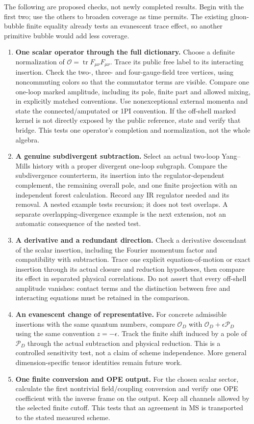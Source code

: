 \documentclass[11pt]{article}
\newcommand{\tr}{\operatorname{tr}}
\begin{document}
The following are proposed checks, not newly completed results. Begin with
the first two; use the others to broaden coverage as time permits. The
existing gluon-bubble finite equality already tests an evanescent trace
effect, so another primitive bubble would add less coverage.

\begin{enumerate}
\item \textbf{One scalar operator through the full dictionary.}
Choose a definite normalization of $\mathcal O=\tr F_{\mu\nu}F_{\mu\nu}$.
Trace its public free label to its interacting insertion. Check the
two-, three- and four-gauge-field tree vertices, using noncommuting colors
so that the commutator terms are visible. Compare one one-loop marked
amplitude, including its pole, finite part and allowed mixing, in explicitly
matched conventions. Use nonexceptional external momenta and state the
connected/amputated or 1PI convention. If the off-shell marked kernel is
not directly exposed by the public reference, state and verify that bridge.
This tests one operator's completion and normalization, not the whole algebra.
\item \textbf{A genuine subdivergent subtraction.}
Select an actual two-loop Yang--Mills history with a proper divergent
one-loop subgraph. Compare the subdivergence counterterm, its insertion
into the regulator-dependent complement, the remaining overall pole, and
one finite projection with an independent forest calculation. Record any
IR regulator needed and its removal. A nested example tests recursion;
it does not test overlaps. A separate overlapping-divergence example is
the next extension, not an automatic consequence of the nested test.
\item \textbf{A derivative and a redundant direction.}
Check a derivative descendant of the scalar insertion, including the
Fourier momentum factor and compatibility with subtraction. Trace one
explicit equation-of-motion or exact insertion through its actual closure
and reduction hypotheses, then compare its effect in separated physical
correlations. Do not assert that every off-shell amplitude vanishes:
contact terms and the distinction between free and interacting equations
must be retained in the comparison.
\item \textbf{An evanescent change of representative.}
For concrete admissible insertions with the same quantum numbers, compare $\mathcal O_D$ with
$\mathcal O_D+\epsilon\mathcal P_D$ using the same convention
$z=-\epsilon$. Track the finite shift induced by a pole of
$\mathcal P_D$ through the actual subtraction and physical reduction.
This is a controlled sensitivity test, not a claim of scheme independence.
More general dimension-specific tensor identities remain future work.
\item \textbf{One finite conversion and OPE output.}
For the chosen scalar sector, calculate the first nontrivial field/coupling
conversion and verify one OPE coefficient with the inverse frame on the
output. Keep all channels allowed by the selected finite cutoff. This
tests that an agreement in MS is transported to the stated measured scheme.
\end{enumerate}
\end{document}
